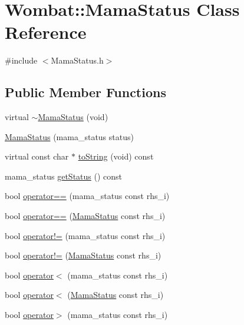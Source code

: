 \hypertarget{classWombat_1_1MamaStatus}{
\section{Wombat::MamaStatus Class Reference}
\label{classWombat_1_1MamaStatus}
}


{\ttfamily \#include $<$MamaStatus.h$>$}\subsection*{Public Member Functions}
\begin{DoxyCompactItemize}
\item 
virtual \hyperlink{classWombat_1_1MamaStatus_a3c2d6f2875eb0d493e574a0fefcc069f}{$\sim$MamaStatus} (void)
\item 
\hyperlink{classWombat_1_1MamaStatus_a216ce6c4ace254d2c8f47332369e27b6}{MamaStatus} (mama\_\-status status)
\item 
virtual const char $\ast$ \hyperlink{classWombat_1_1MamaStatus_a02ff04f38d5416f4b2bfa53482e3bf5f}{toString} (void) const 
\item 
mama\_\-status \hyperlink{classWombat_1_1MamaStatus_aa81706c7b6fb7c0c3e7022a65dc98900}{getStatus} () const 
\item 
bool \hyperlink{classWombat_1_1MamaStatus_a71076ff4eff0cc5d407e2fdda8f5da45}{operator==} (mama\_\-status const rhs\_\-i)
\item 
bool \hyperlink{classWombat_1_1MamaStatus_acbe0311e7bbbfe7e56b8af5a64e76f7f}{operator==} (\hyperlink{classWombat_1_1MamaStatus}{MamaStatus} const rhs\_\-i)
\item 
bool \hyperlink{classWombat_1_1MamaStatus_a68ba5e4ed85254d372ef9f545b1e405e}{operator!=} (mama\_\-status const rhs\_\-i)
\item 
bool \hyperlink{classWombat_1_1MamaStatus_aea70b9860511953e4c019b39a2222976}{operator!=} (\hyperlink{classWombat_1_1MamaStatus}{MamaStatus} const rhs\_\-i)
\item 
bool \hyperlink{classWombat_1_1MamaStatus_adadb56f2f4997e9738a5872dc41276d1}{operator$<$} (mama\_\-status const rhs\_\-i)
\item 
bool \hyperlink{classWombat_1_1MamaStatus_a74b1437ed8dcc7703a42137738e352f7}{operator$<$} (\hyperlink{classWombat_1_1MamaStatus}{MamaStatus} const rhs\_\-i)
\item 
bool \hyperlink{classWombat_1_1MamaStatus_a619bd3813e7ee867d4d119e613a3de62}{operator$>$} (mama\_\-status const rhs\_\-i)
\item 

\end{DoxyCompactItemize}
